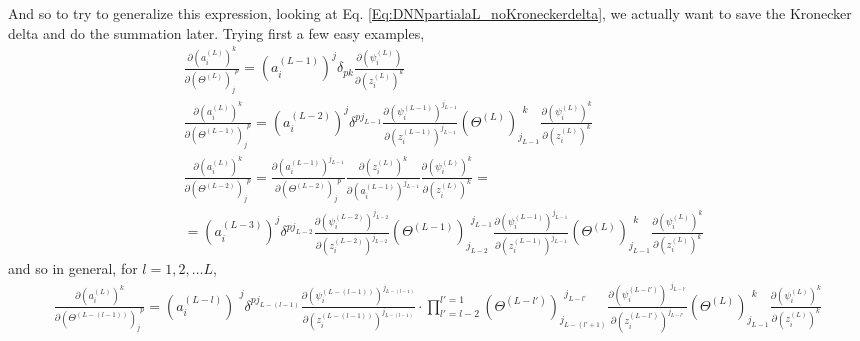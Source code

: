 \documentclass[10pt]{amsart}
\begin{document}
\begin{multicols*}{2}
And so to try to generalize this expression, looking at Eq. \ref{Eq:DNNpartialaL_noKroneckerdelta}, we actually want to save the Kronecker delta and do the summation later.  Trying first a few easy examples, 
\begin{equation}
\begin{aligned}
& \frac{ \partial (a_i^{(L)})^k }{ \partial (\Theta^{(L)})_j^{\  \  p} } = (a_i^{(L-1)})^j \delta_{pk} \frac{\partial (\psi_i^{(L)})}{\partial (z_i^{(L)})^k} \\ 
& \frac{ \partial (a_i^{(L)})^k }{ \partial (\Theta^{(L-1)})_j^{\  \  p} } = (a^{(L-2)}_i)^j \delta^{pj_{L-1}} \frac{\partial (\psi_i^{(L-1)})^{j_{L-1}}}{\partial (z_i^{(L-1)})^{j_{L-1}} } (\Theta^{(L)})_{j_{L-1}}^{\  \  k} \frac{ \partial (\psi_i^{(L)})^k }{ \partial (z_i^{(L)})^k } \\
& \frac{ \partial (a_i^{(L)})^k }{ \partial (\Theta^{(L-2)})_j^{\  \  p} } = \frac{ \partial (a_i^{(L-1)})^{j_{L-1} }}{ \partial (\Theta^{(L-2)})_j^{\  \  p} } \frac{ \partial (z^{(L)}_i)^k }{ \partial (a_i^{(L-1)})^{j_{L-1}} } \frac{ \partial (\psi_i^{(L)})^k }{ \partial (z_i^{(L)})^k } = \\
& = (a^{(L-3)}_i)^j \delta^{pj_{L-2}} \frac{\partial (\psi_i^{(L-2)})^{j_{L-2}}}{\partial (z_i^{(L-2)})^{j_{L-2}} } (\Theta^{(L-1)})_{j_{L-2}}^{\  \  j_{L-1}} \frac{ \partial (\psi_i^{(L-1)})^{j_{L-1} }}{ \partial (z_i^{(L-1)})^{j_{L-1} } } (\Theta^{(L)})_{j_{L-1}}^{\  \  k} \frac{ \partial (\psi_i^{(L)})^k }{ \partial (z_i^{(L)})^k }
\end{aligned}
\end{equation}
and so in general, for $l=1,2,\dots L$, 
\begin{equation}\label{Eq:DNNpartialaL_noKroneckerdelta}
\boxed{ \begin{gathered}
	\frac{\partial (a_i^{(L)})^k }{ \partial (\Theta^{(L-(l-1))})_j^{\  \  p} } =   (a_i^{(L-l)})^{\  \  j} \delta^{pj_{L-(l-1)} }   \frac{ \partial (\psi_i^{(L-(l-1))})^{j_{L-(l-1)} } }{ \partial (z_i^{(L-(l-1))})^{j_{L-(l-1)} } } 	\cdot \prod_{l' = l-2}^{l'=1} (\Theta^{(L-l')})_{ j_{L-(l'+1)}}^{\  \  j_{L-l'}}      \frac{ \partial (\psi_i^{(L-l')})^{\  \  j_{L-l'} } }{ \partial (z_i^{(L-l')})^{ j_{L-l'}} } (\Theta^{(L)})_{ j_{L-1}}^{\  \  k}      \frac{ \partial (\psi_i^{(L)})^{ k } }{ \partial (z_i^{(L)})^{  k} }
	\end{gathered} 
}
\end{equation}


\end{multicols*}
\end{document}
